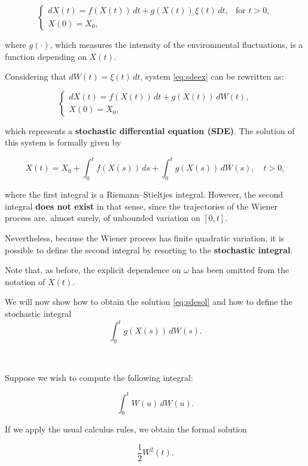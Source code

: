 \documentclass[
  11pt,
  a4paper,
]{book}
\theoremstyle{definition}
\theoremstyle{definition}
\theoremstyle{definition}
\theoremstyle{definition}
\theoremstyle{remark}
\begin{document}
\begin{equation}
\label{eq:sdeex}
\begin{cases}
dX(t)=f(X(t))\,dt + g(X(t))\,\xi(t)\,dt, & \text{for } t>0,\\
X(0)=X_0,
\end{cases}
\end{equation}

where \(g(\cdot)\), which measures the intensity of the environmental fluctuations, is a function depending on \(X(t)\).

Considering that \(dW(t)=\xi(t)\,dt\), system \eqref{eq:sdeex} can be rewritten as:

\[
\begin{cases}
dX(t)=f(X(t))\,dt + g(X(t))\,dW(t),\\
X(0)=X_0,
\end{cases}
\]

which represents a \textbf{stochastic differential equation (SDE)}. The solution of this system is formally given by

\begin{equation}
\label{eq:sdesol}
X(t)=X_0 + \int_0^t f(X(s))\,ds + \int_0^t g(X(s))\,dW(s), \quad t>0,
\end{equation}

where the first integral is a Riemann--Stieltjes integral. However, the second integral \textbf{does not exist} in that sense, since the trajectories of the Wiener process are, almost surely, of unbounded variation on \([0,t]\).

Nevertheless, because the Wiener process has finite quadratic variation, it is possible to define the second integral by resorting to the \textbf{stochastic integral}.

Note that, as before, the explicit dependence on \(\omega\) has been omitted from the notation of \(X(t)\).

We will now show how to obtain the solution \eqref{eq:sdesol} and how to define the stochastic integral
\[
\int_0^t g(X(s))\,dW(s).
\]

\(\,\)

Suppose we wish to compute the following integral:

\[
\int_0^t W(u)\,dW(u).
\]

If we apply the usual calculus rules, we obtain the formal solution

\begin{equation}
\label{eq:solintw}
\frac{1}{2}W^2(t).
\end{equation}
\end{document}
